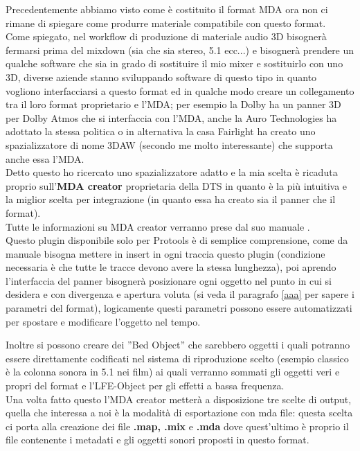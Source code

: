 \documentclass[12pt,a4paper]{report}
\begin{document}
Precedentemente abbiamo visto come è costituito il format MDA ora non ci rimane di spiegare come produrre materiale compatibile con questo format.\\

Come spiegato, nel workflow di produzione di materiale audio 3D bisognerà fermarsi prima del mixdown (sia che sia stereo, 5.1 ecc...) e bisognerà prendere un qualche software che sia in grado di sostituire il mio mixer e sostituirlo con uno 3D, diverse aziende stanno sviluppando software di questo tipo in quanto vogliono interfacciarsi a questo format ed in qualche modo creare un collegamento tra il loro format proprietario e l'MDA; per esempio la Dolby ha un panner 3D per Dolby Atmos che si interfaccia con l'MDA, anche la Auro Technologies ha adottato la stessa politica o in alternativa la casa Fairlight ha creato uno spazializzatore di nome 3DAW (secondo me molto interessante) che supporta anche essa l'MDA.\\

Detto questo ho ricercato uno spazializzatore adatto e la mia scelta è ricaduta proprio sull'\textbf{MDA creator} proprietaria della DTS in quanto è la più intuitiva e la miglior scelta per integrazione (in quanto essa ha creato sia il panner che il format).\\

Tutte le informazioni su MDA creator verranno prese dal suo manuale \cite{creator}.\\

Questo plugin disponibile solo per Protools è di semplice comprensione, come da manuale bisogna mettere in insert in ogni traccia questo plugin (condizione necessaria è che tutte le tracce devono avere la stessa lunghezza), poi aprendo l'interfaccia del panner bisognerà posizionare ogni oggetto nel punto in cui si desidera e con divergenza e apertura voluta (si veda il paragrafo \ref{aaa} per sapere i parametri del format), logicamente questi parametri possono essere automatizzati per spostare e modificare l'oggetto nel tempo.

Inoltre si possono creare dei ''Bed Object'' che sarebbero oggetti i quali potranno essere direttamente codificati nel sistema di riproduzione scelto (esempio classico è la colonna sonora in 5.1 nei film) ai quali verranno sommati gli oggetti veri e propri del format e l'LFE-Object per gli effetti a bassa frequenza.\\

Una volta fatto questo l'MDA creator metterà a disposizione tre scelte di output, quella che interessa a noi è la modalità di esportazione con mda file: questa scelta ci porta alla creazione dei file \textbf{.map, .mix} e \textbf{.mda} dove quest'ultimo è proprio il file contenente i metadati e gli oggetti sonori proposti in questo format.\\
\end{document}
